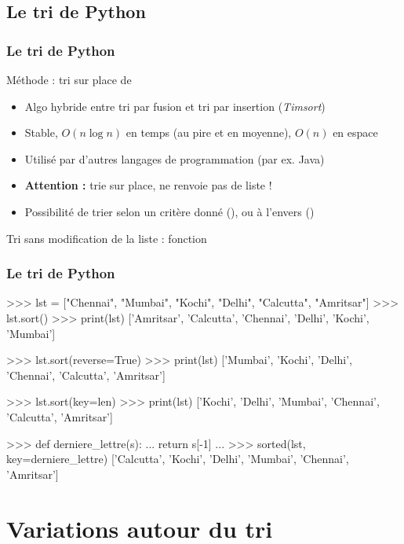 \documentclass[12pt]{linfo-beamer}
\begin{document}
\subsection{Le tri de Python}
\label{sub:le_tri_de_python}

\begin{frame}
\frametitle{Le tri de Python}

Méthode  : tri sur place de 
\begin{itemize}
  \item Algo hybride entre tri par fusion et tri par insertion (\emph{Timsort})
  \item Stable, $O(n \log n)$ en temps (au pire et en moyenne), $O(n)$ en espace
  \item Utilisé par d'autres langages de programmation (par ex. Java)
  \item \textbf{Attention :} trie sur place, ne renvoie pas de liste !
  \item Possibilité de trier selon un critère donné (), ou à l'envers ()
\end{itemize}

\medskip

Tri sans modification de la liste : fonction 
\end{frame}

\begin{frame}[fragile]
\frametitle{Le tri de Python}

\scriptsize
\begin{python}
>>> lst = ["Chennai", "Mumbai", "Kochi", "Delhi", "Calcutta", "Amritsar"]
>>> lst.sort()
>>> print(lst)
['Amritsar', 'Calcutta', 'Chennai', 'Delhi', 'Kochi', 'Mumbai']

>>> lst.sort(reverse=True)
>>> print(lst)
['Mumbai', 'Kochi', 'Delhi', 'Chennai', 'Calcutta', 'Amritsar']

>>> lst.sort(key=len)
>>> print(lst)
['Kochi', 'Delhi', 'Mumbai', 'Chennai', 'Calcutta', 'Amritsar']

>>> def derniere_lettre(s):
...    return s[-1]
...
>>> sorted(lst, key=derniere_lettre)
['Calcutta', 'Kochi', 'Delhi', 'Mumbai', 'Chennai', 'Amritsar']
\end{python}

\end{frame}


\section{Variations autour du tri}
\end{document}
